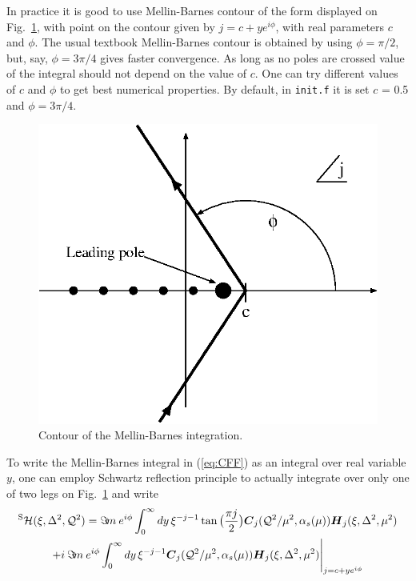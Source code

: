 \documentclass[12pt]{article}
\begin{document}
In practice it is good to use Mellin-Barnes contour of the form displayed
on Fig.~\ref{fig:MellinBarnes}, with point on the contour given
by $j=c+ye^{i\phi}$, with real parameters $c$ and $\phi$.
The usual textbook Mellin-Barnes contour is obtained by
using $\phi = \pi/2$, but, say, $\phi = 3\pi /4$ gives faster
convergence. As long as no poles are crossed value of the
integral should not depend on the value of $c$. One can
try different values of $c$ and $\phi$ to get best numerical
properties. 
By default, in \texttt{init.f} it is set $c$ = 0.5 and $\phi = 3\pi/4$.

\begin{figure}[ht]
\begin{center}
\includegraphics[scale=1.0]{MellinBarnes}
\end{center}
\caption{Contour of the Mellin-Barnes integration.}
\label{fig:MellinBarnes}
\end{figure}


To write the Mellin-Barnes integral in (\ref{eq:CFF}) as an integral
over real variable $y$, one can employ Schwartz reflection principle to
actually integrate over only one of two legs on Fig.~\ref{fig:MellinBarnes}
and write
\begin{multline}
{^{\rm S}{\cal H}}(\xi,\Delta^2,{\cal Q}^2) =
\Im\! m\:  e^{i\phi} 
\int_{0}^{\infty} dy \, \xi^{-j-1}
\tan\big(\frac{\pi j}{2}\big)
\mbox{\boldmath $C$}_{j}({\cal Q}^2/\mu^2,\alpha_s(\mu)) 
\mbox{\boldmath $H$}_{j} (\xi,\Delta^2,\mu^2) \\
+ i\: \Im\! m\:  e^{i\phi} 
\int_{0}^{\infty} dy \, \xi^{-j-1}
\mbox{\boldmath $C$}_{j}({\cal Q}^2/\mu^2,\alpha_s(\mu)) 
\mbox{\boldmath $H$}_{j} (\xi,\Delta^2,\mu^2) 
\Bigg|_{j = c + y e^{i\phi}}
\label{<Hformula>}
\end{multline}
\end{document}
